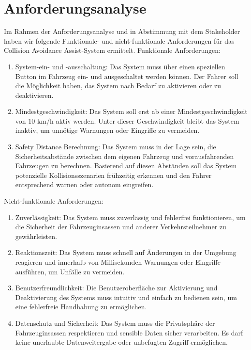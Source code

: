 \section{Anforderungsanalyse}
Im Rahmen der Anforderungsanalyse und in Abstimmung mit dem Stakeholder haben wir folgende Funktionale- und nicht-funktionale Anforderungen für das Collision Avoidance Assist-System ermittelt.
Funktionale Anforderungen:
\begin{enumerate}
	\item System-ein- und -ausschaltung: Das System muss über einen speziellen Button im Fahrzeug ein- und ausgeschaltet werden können. Der Fahrer soll die Möglichkeit haben, das System nach Bedarf zu aktivieren oder zu deaktivieren.
	\item Mindestgeschwindigkeit: Das System soll erst ab einer Mindestgeschwindigkeit von 10 km/h aktiv werden. Unter dieser Geschwindigkeit bleibt das System inaktiv, um unnötige Warnungen oder Eingriffe zu vermeiden.
	\item Safety Distance Berechnung: Das System muss in der Lage sein, die Sicherheitsabstände zwischen dem eigenen Fahrzeug und vorausfahrenden Fahrzeugen zu berechnen. Basierend auf diesen Abständen soll das System potenzielle Kollisionsszenarien frühzeitig erkennen und den Fahrer entsprechend warnen oder autonom eingreifen.
\end{enumerate}
Nicht-funktionale Anforderungen:
\begin{enumerate}
	\item Zuverlässigkeit: Das System muss zuverlässig und fehlerfrei funktionieren, um die Sicherheit der Fahrzeuginsassen und anderer Verkehrsteilnehmer zu gewährleisten.
	\item Reaktionszeit: Das System muss schnell auf Änderungen in der Umgebung reagieren und innerhalb von Millisekunden Warnungen oder Eingriffe ausführen, um Unfälle zu vermeiden.
	\item Benutzerfreundlichkeit: Die Benutzeroberfläche zur Aktivierung und Deaktivierung des Systems muss intuitiv und einfach zu bedienen sein, um eine fehlerfreie Handhabung zu ermöglichen.
	\item Datenschutz und Sicherheit: Das System muss die Privatsphäre der Fahrzeuginsassen respektieren und sensible Daten sicher verarbeiten. Es darf keine unerlaubte Datenweitergabe oder unbefugten Zugriff ermöglichen.
\end{enumerate}
